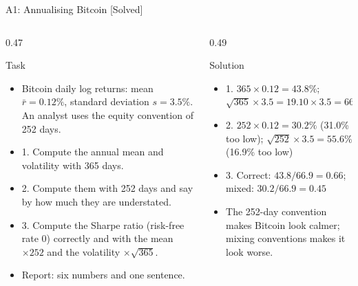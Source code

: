 \begin{frame}{A1: Annualising Bitcoin [Solved]}
\itemsize{\scriptsize}
\begin{columns}[T]
\begin{column}{0.47\textwidth}
\begin{block}{Task}
\begin{itemize}
    \item Bitcoin daily log returns: mean $\bar r = 0.12\%$, standard deviation $s = 3.5\%$. An analyst uses the equity convention of 252 days.
    \item 1. Compute the annual mean and volatility with 365 days.
    \item 2. Compute them with 252 days and say by how much they are understated.
    \item 3. Compute the Sharpe ratio (risk-free rate 0) correctly and with the mean $\times 252$ and the volatility $\times\sqrt{365}$.
    \item Report: six numbers and one sentence.
\end{itemize}
\end{block}
\end{column}
\begin{column}{0.49\textwidth}
\begin{exampleblock}{Solution}
\begin{itemize}
    \item 1. $365 \times 0.12 = 43.8\%$; $\sqrt{365} \times 3.5 = 19.10 \times 3.5 = 66.9\%$
    \item 2. $252 \times 0.12 = 30.2\%$ (31.0\% too low); $\sqrt{252} \times 3.5 = 55.6\%$ (16.9\% too low)
    \item 3. Correct: $43.8/66.9 = 0.66$; mixed: $30.2/66.9 = 0.45$
    \item The 252-day convention makes Bitcoin look calmer; mixing conventions makes it look worse.
\end{itemize}
\end{exampleblock}
\end{column}
\end{columns}
\end{frame}

